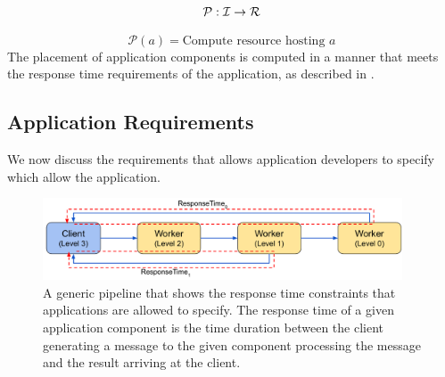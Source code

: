 \begin{equation}
\label{eq:placement_domain_eqn}
\mathcal{P} : \mathcal{I} \rightarrow \mathcal{R}
\end{equation}

\begin{equation}
\label{eq:placement_eqn}
\mathcal{P} \left( a \right) = \text{Compute resource hosting }a
\end{equation}
The placement of application components is computed in a manner that meets the response time requirements of the application, as described in \label{sec:oneedge_app_reqs}.

\subsection{Application Requirements}
\label{sec:oneedge_app_reqs}
We now discuss the requirements that \oneedge{} allows application developers to specify which allow the application.
\begin{figure}
	\centering
	\includegraphics[width=0.95\textwidth]{figures/oneedge/app_pipeline_slo.pdf}
    \caption{
    A generic pipeline that shows the response time constraints that applications are allowed to specify. The response time of a given application component is the time duration between the client generating a message to the given component processing the message and the result arriving at the client.}
	\label{fig:pipeline_lat}
\end{figure}

